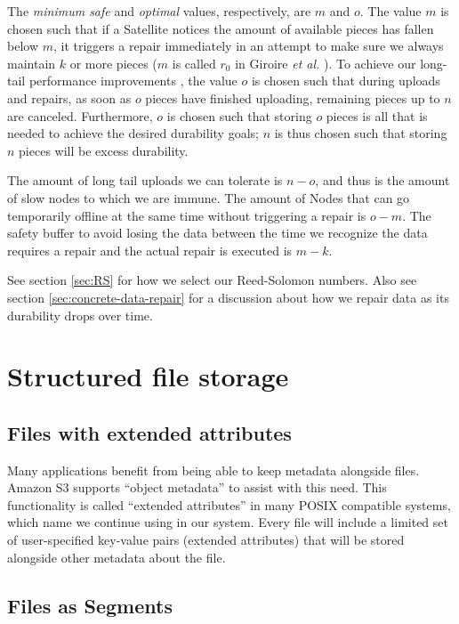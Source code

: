 \documentclass[8pt,fleqn,openany]{book}
\begin{document}
The {\em minimum safe} and {\em optimal} values, respectively, are $m$ and $o$. The
value $m$ is chosen such that if a Satellite notices the amount of available pieces
has fallen below $m$, it triggers a repair
immediately in an attempt to make sure we always maintain
$k$ or more pieces ($m$ is called $r_0$ in Giroire {\em et al.} \cite{p2p-lazy}).
To achieve our long-tail performance improvements
\cite{rs-stragglers, tail-at-scale, mapreduce, rs-intro},
the value $o$ is chosen such that during uploads and repairs,
as soon as $o$ pieces have finished uploading, remaining pieces up to $n$ are
canceled.
Furthermore, $o$ is chosen such that storing $o$ pieces is all that is
needed to achieve the desired durability goals; $n$ is thus chosen such that
storing $n$ pieces will be excess durability.

The amount of long tail uploads we can tolerate is $n-o$, and thus is the amount
of slow nodes to which we are immune.  The amount of Nodes that can go
temporarily offline at the same time without triggering a repair is $o-m$. The
safety buffer to avoid losing the data between the time we recognize the data
requires a repair and the actual repair is executed is $m-k$.

See section \ref{sec:RS} for how we select our Reed-Solomon numbers.
Also see section \ref{sec:concrete-data-repair} for a discussion about
how we repair data as its durability drops over time.

\section{Structured file storage}\label{sec:structured-file-storage}

\subsection{Files with extended attributes}

Many applications benefit from being able to keep metadata alongside files.
Amazon S3 supports ``object metadata'' \cite{s3-object-meta} to assist with this
need. This functionality is called ``extended attributes'' in many POSIX
compatible systems, which name we continue using in our system.
Every file will include a limited set of user-specified key-value pairs
(extended attributes) that will be stored alongside other metadata about the
file.

\subsection{Files as Segments}\label{files-as-segments}
\end{document}
